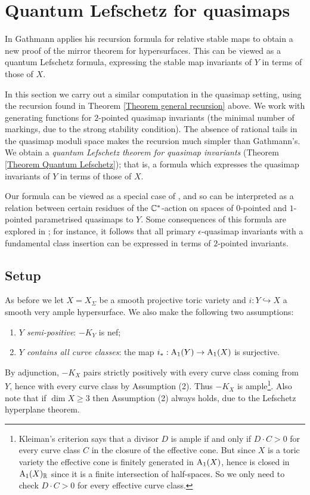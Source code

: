 \section{Quantum Lefschetz for quasimaps} \label{Section quasimap mirror theorem}

In \cite{Ga-MF} Gathmann applies his recursion formula for relative stable maps to obtain a new proof of the mirror theorem for hypersurfaces. This can be viewed as a quantum Lefschetz formula, expressing the stable map invariants of $Y$ in terms of those of $X$.

In this section we carry out a similar computation in the quasimap setting, using the recursion found in Theorem \ref{Theorem general recursion} above. We work with generating functions for $2$-pointed quasimap invariants (the minimal number of markings, due to the strong stability condition). The absence of rational tails in the quasimap moduli space makes the recursion much simpler than Gathmann's. We obtain a \emph{quantum Lefschetz theorem for quasimap invariants} (Theorem \ref{Theorem Quantum Lefschetz}); that is, a formula which expresses the quasimap invariants of $Y$ in terms of those of $X$.

Our formula can be viewed as a special case of \cite[Corollary 5.5.1]{CF-K-wallcrossing}, and so can be interpreted as a relation between certain residues of the $\mathbb{C}^*$-action on spaces of $0$-pointed and $1$-pointed parametrised quasimaps to $Y$. Some consequences of this formula are explored in \cite[Section 5.5]{CF-K-wallcrossing}; for instance, it follows that all primary $\epsilon$-quasimap invariants with a fundamental class insertion can be expressed in terms of $2$-pointed invariants.

\subsection{Setup}
As before we let $X=X_{\Sigma}$ be a smooth projective toric variety and $i \colon Y \hookrightarrow X$ a smooth very ample hypersurface. We also make the following two assumptions:
\begin{enumerate}
\item \emph{$Y$ semi-positive}: $-K_Y$ is nef;
\item \emph{$Y$ contains all curve classes}: the map $i_* : \operatorname{A}_1(Y) \rightarrow \operatorname{A}_1(X)$ is surjective.
\end{enumerate}
By adjunction, $-K_X$ pairs strictly positively with every curve class coming from $Y$, hence with every curve class by Assumption (2). Thus $-K_X$ is ample\footnote{Kleiman's criterion says that a divisor $D$ is ample if and only if $D \cdot C > 0$ for every curve class $C$ in the closure of the effective cone. But since $X$ is a toric variety the effective cone is finitely generated in $\operatorname{A}_1(X)$, hence is closed in $\operatorname{A}_1(X)_{\mathbb{R}}$ since it is a finite intersection of half-spaces. So we only need to check $D \cdot C > 0$ for every effective curve class.}. Also note that if $\dim X \geq 3$ then Assumption (2) always holds, due to the Lefschetz hyperplane theorem.

